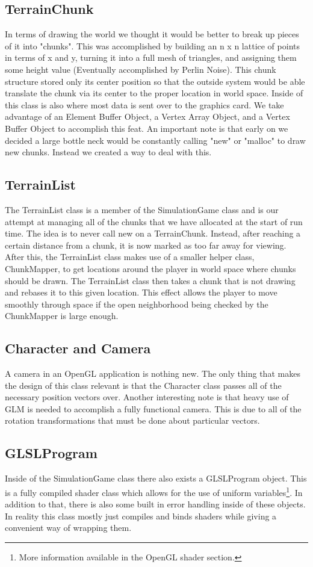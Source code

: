 \documentclass[paper=a4, fontsize=11pt]{scrartcl}
\numberwithin{equation}{section}		%
\numberwithin{figure}{section}			%
\numberwithin{table}{section}				%
\begin{document}
\subsection{TerrainChunk}
In terms of drawing the world we thought it would be better to break up pieces of it into "chunks". This was accomplished by building an n x n lattice of points in terms of x and y, turning it into a full mesh of triangles, and assigning them some height value (Eventually accomplished by Perlin Noise). This chunk structure stored only its center position so that the outside system would be able translate the chunk via its center to the proper location in world space. Inside of this class is also where most data is sent over to the graphics card. We take advantage of an Element Buffer Object, a Vertex Array Object, and a Vertex Buffer Object to accomplish this feat. An important note is that early on we decided a large bottle neck would be constantly calling "new" or "malloc" to draw new chunks. Instead we created a way to deal with this.
\subsection{TerrainList}
The TerrainList class is a member of the SimulationGame class and is our attempt at managing all of the chunks that we have allocated at the start of run time. The idea is to never call new on a TerrainChunk. Instead, after reaching a certain distance from a chunk, it is now marked as too far away for viewing. After this, the TerrainList class makes use of a smaller helper class, ChunkMapper, to get locations around the player in world space where chunks should be drawn. The TerrainList class then takes a chunk that is not drawing and rebases it to this given location. This effect allows the player to move smoothly through space if the open neighborhood being checked by the ChunkMapper is large enough.
\subsection{Character and Camera}
A camera in an OpenGL application is nothing new. The only thing that makes the design of this class relevant is that the Character class passes all of the necessary position vectors over. Another interesting note is that heavy use of GLM is needed to accomplish a fully functional camera. This is due to all of the rotation transformations that must be done about particular vectors.
\subsection{GLSLProgram}
Inside of the SimulationGame class there also exists a GLSLProgram object. This is a fully compiled shader class which allows for the use of uniform variables\footnote{More information available in the OpenGL shader section.}. In addition to that, there is also some built in error handling inside of these objects. In reality this class mostly just compiles and binds shaders while giving a convenient way of wrapping them.
\end{document}
